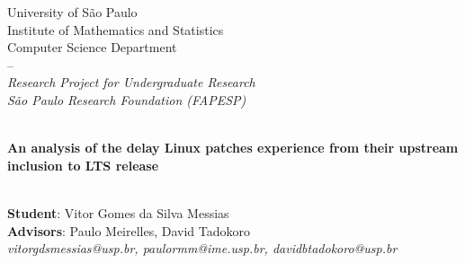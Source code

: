 \documentclass[12pt]{article}
\begin{document}
\onehalfspacing

\begin{center}
University of São Paulo\\
Institute of Mathematics and Statistics\\
Computer Science Department\\
--\\
\textit{Research Project for Undergraduate Research
\\São Paulo Research Foundation (FAPESP)}\\

\hfill\\

\begin{Large}
    \textbf{An analysis of the delay Linux patches experience from their upstream inclusion to LTS release} %
\end{Large}

\hfill\\

\textbf{Student}: Vitor Gomes da Silva Messias\\
\textbf{Advisors}: Paulo Meirelles, David Tadokoro\\
\textit{vitorgdsmessias@usp.br, paulormm@ime.usp.br, davidbtadokoro@usp.br}
\end{center}
\end{document}
